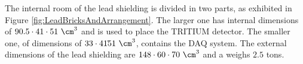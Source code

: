 The internal room of the lead shielding is divided in two parts, as exhibited in Figure \ref{fig:LeadBricksAndArrangement}. The larger one has internal dimensions of $90.5 \cdot{} 41 \cdot{} 51~\cm^3$ and is used to place the TRITIUM detector. The smaller one, of dimensions of $33 \cdot{} 41 \dot{} 51~\cm^3$, contains the DAQ system. The external dimensions of the lead shielding are $148 \cdot{} 60 \cdot{} 70~\cm^3$ and a weighs $2.5$ tons.